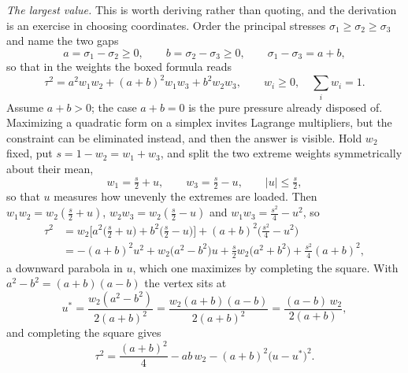 \begin{solution}
\medskip
\noindent\emph{The largest value.}
This is worth deriving rather than quoting, and the derivation is an
exercise in choosing coordinates. Order the principal stresses
$\sigma_{1}\geq\sigma_{2}\geq\sigma_{3}$ and name the two gaps
\[
   a=\sigma_{1}-\sigma_{2}\geq0,
   \qquad
   b=\sigma_{2}-\sigma_{3}\geq0,
   \qquad
   \sigma_{1}-\sigma_{3}=a+b ,
\]
so that in the weights the boxed formula reads
\begin{equation}
   \tau^{2}=a^{2}w_{1}w_{2}+(a+b)^{2}w_{1}w_{3}+b^{2}w_{2}w_{3},
   \qquad w_{i}\geq0,\quad \textstyle\sum_{i}w_{i}=1 .
   \tag{$\sharp$}\label{eq:ch6shearw}
\end{equation}
Assume $a+b>0$; the case $a+b=0$ is the pure pressure already disposed
of. Maximizing a quadratic form on a simplex invites Lagrange
multipliers, but the constraint can be eliminated instead, and then the
answer is visible. Hold $w_{2}$ fixed, put $s=1-w_{2}=w_{1}+w_{3}$, and
split the two extreme weights symmetrically about their mean,
\[
   w_{1}=\tfrac{s}{2}+u,\qquad w_{3}=\tfrac{s}{2}-u,
   \qquad |u|\leq\tfrac{s}{2},
\]
so that $u$ measures how unevenly the extremes are loaded. Then
$w_{1}w_{2}=w_{2}(\tfrac{s}{2}+u)$,
$w_{2}w_{3}=w_{2}(\tfrac{s}{2}-u)$ and
$w_{1}w_{3}=\tfrac{s^{2}}{4}-u^{2}$, so
\[
\begin{aligned}
   \tau^{2}&=w_{2}\Big[a^{2}\big(\tfrac{s}{2}+u\big)
     +b^{2}\big(\tfrac{s}{2}-u\big)\Big]
     +(a+b)^{2}\Big(\tfrac{s^{2}}{4}-u^{2}\Big)\\
   &=-(a+b)^{2}u^{2}+w_{2}\big(a^{2}-b^{2}\big)u
     +\tfrac{s}{2}w_{2}\big(a^{2}+b^{2}\big)
     +\tfrac{s^{2}}{4}(a+b)^{2} ,
\end{aligned}
\]
a downward parabola in $u$, which one maximizes by completing the
square. With $a^{2}-b^{2}=(a+b)(a-b)$ the vertex sits at
\[
   u^{*}=\frac{w_{2}(a^{2}-b^{2})}{2(a+b)^{2}}
   =\frac{w_{2}(a+b)(a-b)}{2(a+b)^{2}}
   =\frac{(a-b)\,w_{2}}{2(a+b)} ,
\]
and completing the square gives
\begin{equation}
   \tau^{2}=\frac{(a+b)^{2}}{4}
   -ab\,w_{2}
   -(a+b)^{2}\big(u-u^{*}\big)^{2} .
   \tag{$\sharp\sharp$}\label{eq:ch6shearmax}
\end{equation}



\end{solution}
